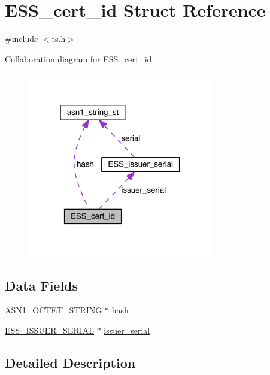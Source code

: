 \hypertarget{struct_e_s_s__cert__id}{}\section{E\+S\+S\+\_\+cert\+\_\+id Struct Reference}
\label{struct_e_s_s__cert__id}


{\ttfamily \#include $<$ts.\+h$>$}



Collaboration diagram for E\+S\+S\+\_\+cert\+\_\+id\+:\nopagebreak
\begin{figure}[H]
\begin{center}
\leavevmode
\includegraphics[width=229pt]{struct_e_s_s__cert__id__coll__graph}
\end{center}
\end{figure}
\subsection*{Data Fields}
\begin{DoxyCompactItemize}
\item 
\hyperlink{crypto_2ossl__typ_8h_afbd05e94e0f0430a2b729473efec88c1}{A\+S\+N1\+\_\+\+O\+C\+T\+E\+T\+\_\+\+S\+T\+R\+I\+NG} $\ast$ \hyperlink{struct_e_s_s__cert__id_acb07a00481518925c973a02fd52209d3}{hash}
\item 
\hyperlink{crypto_2ts_2ts_8h_a9006b3b8a052856402cfac66160241e2}{E\+S\+S\+\_\+\+I\+S\+S\+U\+E\+R\+\_\+\+S\+E\+R\+I\+AL} $\ast$ \hyperlink{struct_e_s_s__cert__id_a05d32c5c150d087c86bee956d63326ff}{issuer\+\_\+serial}
\end{DoxyCompactItemize}


\subsection{Detailed Description}


